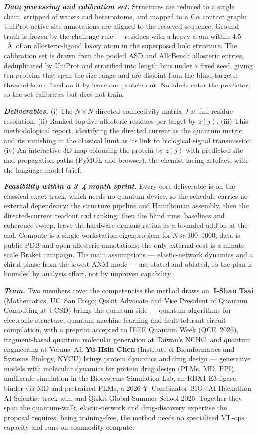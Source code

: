 \documentclass[10pt,a4paper]{article}
\newcommand{\lead}[1]{\textbf{\textit{#1}}}
\begin{document}
\lead{Data processing and calibration set.} Structures are reduced to a single chain, stripped of
waters and heteroatoms, and mapped to a C$\alpha$ contact graph; UniProt active-site annotations are
aligned to the resolved sequence. Ground truth is frozen by the challenge rule --- residues with a
heavy atom within $4.5$~\AA\ of an allosteric-ligand heavy atom in the superposed holo structure. The
calibration set is drawn from the pooled ASD and AlloBench allosteric entries, deduplicated by UniProt
and stratified into length bins under a fixed seed, giving ten proteins that span the size range and
are disjoint from the blind targets; thresholds are fixed on it by leave-one-protein-out. No labels
enter the predictor, so the set calibrates but does not train.

\lead{Deliverables.} (i) The $N\times N$ directed connectivity matrix $J$ at full residue resolution.
(ii) Ranked top-five allosteric residues per target by $z(j)$. (iii) This methodological report,
identifying the directed current as the quantum metric and its vanishing in the classical limit as
its link to biological signal transmission. (iv) An interactive 3D map colouring the protein by $z(j)$
with predicted site and propagation paths (PyMOL and browser), the chemist-facing artefact, with the
language-model brief.

\lead{Feasibility within a 3--4 month sprint.} Every core deliverable is on the classical-exact track,
which needs no quantum device, so the schedule carries no external dependency: the structure pipeline
and Hamiltonian assembly, then the directed-current readout and ranking, then the blind runs,
baselines and coherence sweep, leave the hardware demonstration as a bounded add-on at the end.
Compute is a single-workstation eigenproblem for $N\approx300$--$1000$; data is public PDB and open
allosteric annotations; the only external cost is a minute-scale Braket campaign. The main assumptions
--- elastic-network dynamics and a chiral phase from the lowest ANM mode --- are stated and ablated,
so the plan is bounded by analysis effort, not by unproven capability.

\lead{Team.} Two members cover the competencies the method draws on. \textbf{I-Shan Tsai}
(Mathematics, UC~San Diego; Qiskit Advocate and Vice President of Quantum Computing at UCSD) brings
the quantum side --- quantum algorithms for electronic structure, quantum machine learning and
fault-tolerant circuit compilation, with a preprint accepted to IEEE Quantum Week (QCE~2026),
fragment-based quantum molecular generation at Taiwan's NCHC, and quantum engineering at Vernus~AI.
\textbf{Yu-Hsin Chen} (Institute of Bioinformatics and Systems Biology, NYCU) brings protein dynamics
and drug design --- generative models with molecular dynamics for protein drug design (PLMs, MD, PPI),
multiscale simulation in the Biosystems Simulation Lab, an RBX1 E3-ligase binder via MD and pretrained
PLMs, a 2026 Y~Combinator BIO$\times$AI Hackathon AI-Scientist-track win, and Qiskit Global Summer
School 2026. Together they span the quantum-walk, elastic-network and drug-discovery expertise the
proposal requires; being training-free, the method needs no specialised ML-ops capacity and runs on
commodity compute.
\end{document}
